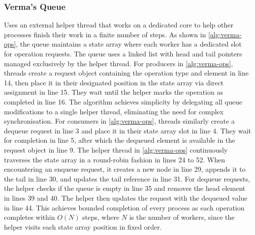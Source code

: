 \subsubsection{Verma's Queue}\label{subsubsec:verma-queue}
Uses an external helper thread that works on a dedicated core to help other processes finish their work in a finite number of steps. As shown in \cref{alg:verma-ops}, the queue maintains a state array where each worker has a dedicated slot for operation requests. The queue uses a linked list with head and tail pointers managed exclusively by the helper thread. For producers in \cref{alg:verma-ops}, threads create a request object containing the operation type and element in line 14, then place it in their designated position in the state array via direct assignment in line 15. They wait until the helper marks the operation as completed in line 16. The algorithm achieves simplicity by delegating all queue modifications to a single helper thread, eliminating the need for complex synchronisation. For consumers in \cref{alg:verma-ops}, threads similarly create a dequeue request in line 3 and place it in their state array slot in line 4. They wait for completion in line 5, after which the dequeued element is available in the request object in line 9. The helper thread in \cref{alg:verma-ops} continuously traverses the state array in a round-robin fashion in lines 24 to 52. When encountering an enqueue request, it creates a new node in line 29, appends it to the tail in line 30, and updates the tail reference in line 31. For dequeue requests, the helper checks if the queue is empty in line 35 and removes the head element in lines 39 and 40. The helper then updates the request with the dequeued value in line 44. This achieves bounded completion of every process as each operation completes within $O(N)$ steps, where $N$ is the number of workers, since the helper visits each state array position in fixed order. \cite{Verma2013Scalable}

